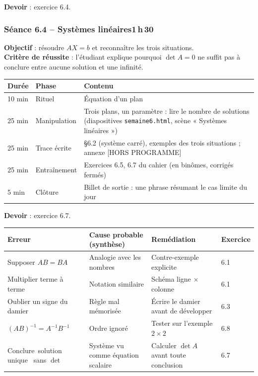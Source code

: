 \documentclass[10.5pt,a4paper]{article}
\newif\ifprof
\providecommand{\og}{\guillemotleft\,}\providecommand{\fg}{\,\guillemotright}
\newcommand{\horsprog}{\textsf{\textcolor{ardoise}{[HORS PROGRAMME]}}}
\newcommand{\synth}{\textsf{\textcolor{ardoise}{(synthèse)}}}
\newcommand{\profonly}[1]{\ifprof #1\fi}
\begin{document}
\textbf{Devoir} : exercice 6.4.\profonly{ \textbf{Point de vigilance} : Inverser $AB$ : ordre des facteurs inversé.}\par
{}\subsubsection*{\textcolor{marine}{Séance 6.4 -- Systèmes linéaires}\hfill\normalfont\small\textcolor{ardoise}{1\,h\,30}}
\begin{objectif}\textbf{Objectif} : résoudre $AX=b$ et reconnaître les trois situations.\\\textbf{Critère de réussite} : l'étudiant explique pourquoi $\det A=0$ ne suffit pas à conclure entre aucune solution et une infinité.\end{objectif}\nopagebreak
\begin{longtable}{@{}p{1.1cm}p{2.4cm}p{12.4cm}@{}}
\toprule \textbf{Durée} & \textbf{Phase} & \textbf{Contenu}\\ \midrule\endhead
10 min & Rituel & Équation d'un plan\\
25 min & Manipulation & Trois plans, un paramètre : lire le nombre de solutions (diapositives \texttt{semaine6.html}, scène « Systèmes linéaires »)\\
25 min & Trace écrite & \S6.2 (système carré), exemples des trois situations ; annexe \horsprog\\
25 min & Entraînement & Exercices 6.5, 6.7 du cahier (en binômes, corrigés fermés)\\
5 min & Clôture & Billet de sortie : une phrase résumant le cas limite du jour\\ \bottomrule\end{longtable}\nopagebreak
\textbf{Devoir} : exercice 6.7.\profonly{ \textbf{Point de vigilance} : L'annexe sur les valeurs propres est hors programme : ne pas l'évaluer.}\par
\ifprof
\begin{longtable}{@{}p{4.8cm}p{3.6cm}p{4.9cm}p{1.6cm}@{}}
\toprule \textbf{Erreur} & \textbf{Cause probable \synth} & \textbf{Remédiation} & \textbf{Exercice}\\ \midrule\endhead
Supposer $AB=BA$ & Analogie avec les nombres & Contre-exemple explicite & 6.1\\
Multiplier terme à terme & Notation similaire & Schéma ligne $\times$ colonne & 6.1\\
Oublier un signe du damier & Règle mal mémorisée & Écrire le damier avant de développer & 6.3\\
$(AB)^{-1}=A^{-1}B^{-1}$ & Ordre ignoré & Tester sur l'exemple $2\times2$ & 6.8\\
Conclure \og solution unique \fg{} sans $\det$ & Système vu comme équation scalaire & Calculer $\det A$ avant toute conclusion & 6.7\\
\bottomrule\end{longtable}
\end{document}
